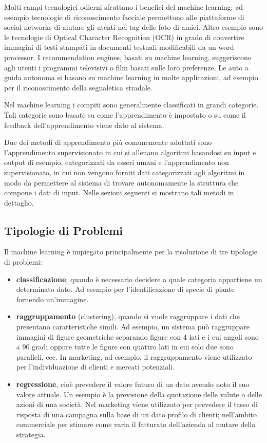 Molti campi tecnologici odierni sfruttano i benefici del machine learning; ad esempio tecnologie di riconoscimento facciale permettono alle piattaforme di social networks di aiutare gli utenti nel tag delle foto di amici. Altro esempio sono le tecnologie di Optical Character Recognition (OCR) in grado di convertire immagini di testi stampati in documenti testuali modificabili da un word processor. I recommendation engines, basati su machine learning, suggeriscono agli utenti i programmi televisivi o film basati sulle loro preferenze. Le auto a guida autonoma si basano su machine learning in molte applicazioni, ad esempio per il riconoscimento della segnaletica stradale.

Nel machine learning i compiti sono generalmente classificati in grandi categorie. Tali categorie sono basate su come l'apprendimento è impostato o su come il feedback dell'apprendimento viene dato al sistema.

Due dei metodi di apprendimento più comunemente adottati sono l'apprendimento supervisionato in cui si allenano algoritmi basandosi su input e output di esempio, categorizzati da esseri umani e l'apprendimento non supervisionato, in cui non vengono forniti dati categorizzati agli algoritmi in modo da permettere al sistema di trovare autonomamente la struttura che compone i dati di input. Nelle sezioni seguenti si mostrano tali metodi in dettaglio.

\subsection{Tipologie di Problemi}
Il machine learning è impiegato principalmente per la risoluzione di tre tipologie di problemi:
\begin{itemize}
\item \textbf{classificazione}, quando è necessario decidere a quale categoria appartiene un determinato dato. Ad esempio per l'identificazione di specie di piante fornendo un'immagine.
\item \textbf{raggruppamento} (clustering), quando si vuole raggruppare i dati che presentano caratteristiche simili. Ad esempio, un sistema può raggruppare immagini di figure geometriche separando figure con 4 lati e i cui angoli sono a 90 gradi oppure tutte le figure con quattro lati in cui solo due sono paralleli, ecc. In marketing, ad esempio, il raggruppamento viene utilizzato per l'individuazione di clienti e mercati potenziali.
\item \textbf{regressione}, cioè prevedere il valore futuro di un dato avendo noto il suo valore attuale. Un esempio è la previsione della quotazione delle valute o delle azioni di una società. Nel marketing viene utilizzato per prevedere il tasso di risposta di una campagna sulla base di un dato profilo di clienti; nell'ambito commerciale per stimare come varia il fatturato dell'azienda al mutare della strategia.
\end{itemize}

